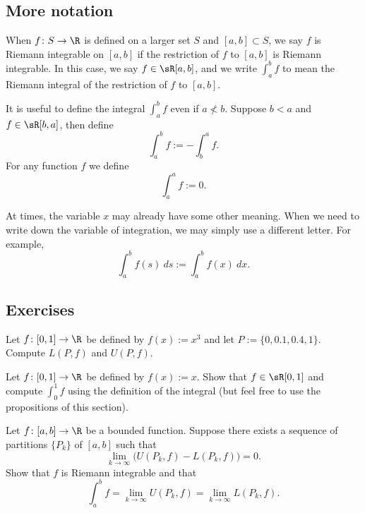\documentclass[12pt]{book}
\begin{document}
\subsection*{More notation}

When $f \colon S \to \R$ is defined on a larger set $S$ and
$[a,b] \subset S$,
we say $f$ is Riemann integrable on $[a,b]$ if the restriction of $f$
to $[a,b]$ is Riemann integrable. 
In this case,
we say $f \in \sR[a,b]$,
and
we write $\int_a^b f$ to mean the Riemann integral
of the restriction of $f$ to $[a,b]$.

It is useful to define the integral $\int_a^b f$ even if
$a \not< b$.
Suppose $b < a$ and $f \in \sR[b,a]$,
then define
\begin{equation*}
\int_a^b f := - \int_b^a f .
\end{equation*}
For any function $f$ we define
\begin{equation*}
\int_a^a f := 0 .
\end{equation*}

At times, the variable $x$ may already have some other meaning.
When
we need to write down the variable of integration, we may simply
use a different letter.
For example,
\begin{equation*}
\int_a^b f(s)~ds := \int_a^b f(x)~dx .
\end{equation*}

\subsection*{Exercises}

\begin{exercise}
Let $f \colon [0,1] \to \R$ be defined by $f(x) := x^3$
and let $P := \{ 0, 0.1, 0.4, 1 \}$.
Compute $L(P,f)$ and $U(P,f)$.
\end{exercise}

\begin{exercise}
Let $f \colon [0,1] \to \R$ be defined by $f(x) := x$.
Show that $f \in \sR[0,1]$ and
compute $\int_0^1 f$ using the definition of the integral
(but
feel free to use the propositions of this section).%
\end{exercise}

\begin{exercise}
Let $f \colon [a,b] \to \R$ be a bounded function.
Suppose there exists a sequence of partitions $\{ P_k \}$ of $[a,b]$
such that
\begin{equation*}
\lim_{k \to \infty} \bigl( U(P_k,f) - L(P_k,f) \bigr) = 0 .
\end{equation*}
Show that $f$ is Riemann integrable and that
\begin{equation*}
\int_a^b f = 
\lim_{k \to \infty} U(P_k,f)
=
\lim_{k \to \infty} L(P_k,f) .
\end{equation*}
\end{exercise}
\end{document}
